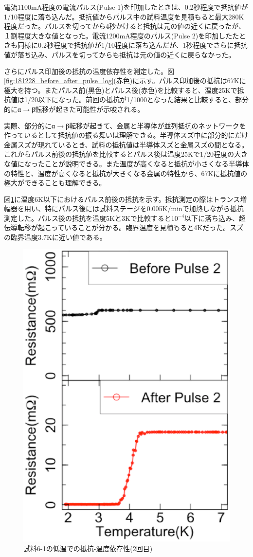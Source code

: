 電流1100mA程度の電流パルス(Pulse 1)を印加したときは、0.2秒程度で抵抗値が1/10程度に落ち込んだ。抵抗値からパルス中の試料温度を見積もると最大280K程度だった。パルスを切ってから4秒かけると抵抗は元の値の近くに戻ったが、１割程度大きな値となった。電流1200mA程度のパルス(Pulse 2)を印加したたときも同様に0.2秒程度で抵抗値が1/10程度に落ち込んだが、1秒程度でさらに抵抗値が落ち込み、パルスを切ってからも抵抗は元の値の近くに戻らなかった。%

さらにパルス印加後の抵抗の温度依存性を測定した。図\ref{fig:181228_before_after_pulse_log}(赤色)に示す。パルス印加後の抵抗は67Kに極大を持つ。またパルス前(黒色)とパルス後(赤色)を比較すると、温度25Kで抵抗値は1/20以下になった。前回の抵抗が1/1000となった結果と比較すると、部分的にα$\to$β転移が起きた可能性が示唆される。

実際、部分的にα$\to$β転移が起きて、金属と半導体が並列抵抗のネットワークを作っているとして抵抗値の振る舞いは理解できる。半導体スズ中に部分的にだけ金属スズが現れているとき、試料の抵抗値は半導体スズと金属スズの間となる。これからパルス前後の抵抗値を比較するとパルス後は温度25Kで1/20程度の大きな値になったことが説明できる。また温度が高くなると抵抗が小さくなる半導体の特性と、温度が高くなると抵抗が大きくなる金属の特性から、67Kに抵抗値の極大ができることも理解できる\cite{Mayr,McLachlan}。

図\ref{fig:181228_after_pulse}に温度6K以下におけるパルス前後の抵抗を示す。抵抗測定の際はトランス増幅器を用い、特にパルス後には試料ステージを0.005K/minで加熱しながら抵抗測定した。パルス後の抵抗を温度5Kと3Kで比較すると$10^{-4}$以下に落ち込み、超伝導転移が起こっていることが分かる。臨界温度を見積もると4Kだった。スズの臨界温度3.7Kに近い値である。
\begin{figure}[!h]
\begin{center}
   \includegraphics[width=0.4\hsize]{results_discussions/low1.eps}
  \end{center}
  \caption{試料6-1の低温での抵抗-温度依存性(2回目)}
  \label{fig:181228_after_pulse}
\end{figure}

